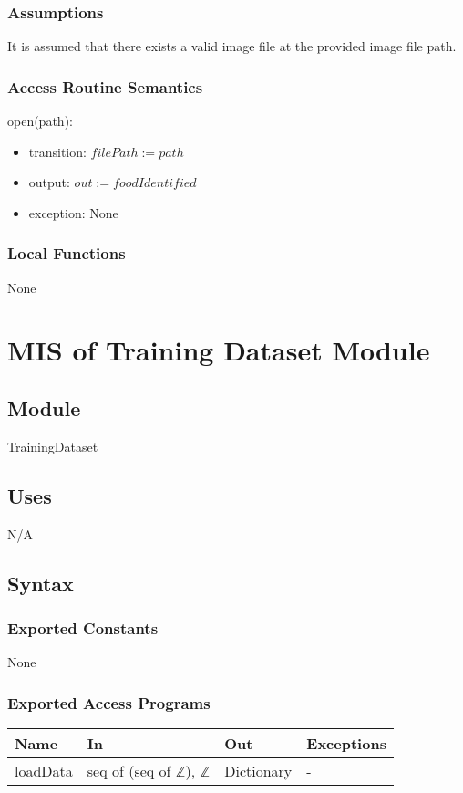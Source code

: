 \documentclass[12pt, titlepage]{article}
\begin{document}
\subsubsection{Assumptions}
It is assumed that there exists a valid image file at the provided image file path.
\subsubsection{Access Routine Semantics}
\noindent open(path):
\begin{itemize}
	\item transition: $filePath := path$
	\item output: $out := foodIdentified$
	\item exception: None
\end{itemize}
\subsubsection{Local Functions}
None

\newpage

\section{MIS of Training Dataset Module} \label{TrainingDataset}
\subsection{Module}
TrainingDataset
\subsection{Uses}
N/A
\subsection{Syntax}
\subsubsection{Exported Constants}
None
\subsubsection{Exported Access Programs}
\begin{center}
	\begin{tabular}{p{2cm} p{5cm} p{5cm} p{2cm}}
		\hline
		\textbf{Name} & \textbf{In} & \textbf{Out} & \textbf{Exceptions} \\
		\hline
		loadData & seq of (seq of $\mathbb{Z}$), $\mathbb{Z}$ & Dictionary & - \\
		\hline
	\end{tabular}
\end{center}
\end{document}

